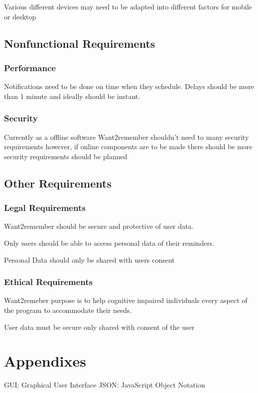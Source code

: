 \documentclass[
]{article}
\begin{document}
Various different devices may need to be adapted into different factors
for mobile or desktop

\subsection{Nonfunctional
Requirements}\label{nonfunctional-requirements}

\subsubsection{Performance}\label{performance}

Notifications need to be done on time when they schedule. Delays should
be more than 1 minute and ideally should be instant.

\subsubsection{Security}\label{security}

Currently as a offline software Want2remember shouldn't need to many
security requirements however, if online components are to be made there
should be more security requirements should be planned

\subsection{Other Requirements}\label{other-requirements}

\subsubsection{Legal Requirements}\label{legal-requirements}

Want2remember should be secure and protective of user data.

Only users should be able to access personal data of their reminders.

Personal Data should only be shared with users consent

\subsubsection{Ethical Requirements}\label{ethical-requirements}

Want2remeber purpose is to help cognitive impaired individuals every
aspect of the program to accommodate their needs.

User data must be secure only shared with consent of the user

\section{Appendixes}\label{appendixes}
GUI: Graphical User Interface
JSON: JavaScript Object Notation
\end{document}
